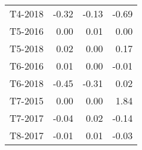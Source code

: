 \begin{tabular}{lrrr}
     T4-2018 &                    -0.32 &                   -0.13 &                     -0.69 \\
     T5-2016 &                     0.00 &                    0.01 &                      0.00 \\
     T5-2018 &                     0.02 &                    0.00 &                      0.17 \\
     T6-2016 &                     0.01 &                    0.00 &                     -0.01 \\
     T6-2018 &                    -0.45 &                   -0.31 &                      0.02 \\
     T7-2015 &                     0.00 &                    0.00 &                      1.84 \\
     T7-2017 &                    -0.04 &                    0.02 &                     -0.14 \\
     T8-2017 &                    -0.01 &                    0.01 &                     -0.03 \\
\bottomrule
\end{tabular}
